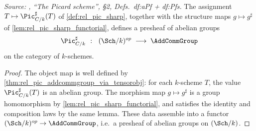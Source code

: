 \begin{theorem}\leanok
  \label{thm:rel_pic_sharp_presheaf}

  \textit{Source: \cite{kleiman-picard}, ``The Picard scheme'', \S 2,
  Defs.~df:aPf + df:Pfs.}
  The assignment \(T \mapsto \Pic^\sharp_{C/k}(T)\) of \cref{def:rel_pic_sharp},
  together with the structure maps \(g \mapsto g^\sharp\) of
  \cref{lem:rel_pic_sharp_functorial}, defines a presheaf of abelian groups
  \[
    \Pic^\sharp_{C/k} \;\;\colon\;\; (\Sch/k)^{op} \;\longrightarrow\;
                                     \AddCommGroup
  \]
  on the category of \(k\)-schemes.
\end{theorem}

\begin{proof}




\leanok
  The object map is well defined by
  \cref{thm:rel_pic_addcommgroup_via_tensorobj}: for each \(k\)-scheme
  \(T\), the value \(\Pic^\sharp_{C/k}(T)\) is an abelian group. The
  morphism map \(g \mapsto g^\sharp\) is a group homomorphism by
  \cref{lem:rel_pic_sharp_functorial}, and satisfies the identity and
  composition laws by the same lemma. These data assemble into a functor
  \((\Sch/k)^{op} \to \AddCommGroup\), i.e.\ a presheaf of abelian groups on
  \((\Sch/k)\).
\end{proof}

